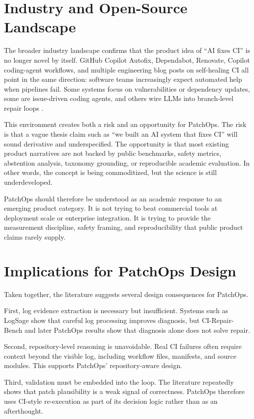 \section{Industry and Open-Source Landscape}

The broader industry landscape confirms that the product idea of ``AI fixes CI'' is no longer novel by itself.
GitHub Copilot Autofix, Dependabot, Renovate, Copilot coding-agent workflows, and multiple engineering blog
posts on self-healing CI all point in the same direction: software teams increasingly expect automated help when
pipelines fail. Some systems focus on vulnerabilities or dependency updates, some are issue-driven coding
agents, and others wire LLMs into branch-level repair loops \cite{logsage2025}.

This environment creates both a risk and an opportunity for PatchOps. The risk is that a vague thesis claim
such as ``we built an AI system that fixes CI'' will sound derivative and underspecified. The opportunity is
that most existing product narratives are not backed by public benchmarks, safety metrics, abstention analysis,
taxonomy grounding, or reproducible academic evaluation. In other words, the concept is being commoditized, but
the science is still underdeveloped.

PatchOps should therefore be understood as an academic response to an emerging product category. It is not
trying to beat commercial tools at deployment scale or enterprise integration. It is trying to provide the
measurement discipline, safety framing, and reproducibility that public product claims rarely supply.

\section{Implications for PatchOps Design}

Taken together, the literature suggests several design consequences for PatchOps.

First, log evidence extraction is necessary but insufficient. Systems such as LogSage show that careful log
processing improves diagnosis, but CI-Repair-Bench and later PatchOps results show that diagnosis alone does not
solve repair.

Second, repository-level reasoning is unavoidable. Real CI failures often require context beyond the visible log,
including workflow files, manifests, and source modules. This supports PatchOps' repository-aware design.

Third, validation must be embedded into the loop. The literature repeatedly shows that patch plausibility is a
weak signal of correctness. PatchOps therefore uses CI-style re-execution as part of its decision logic rather
than as an afterthought.

